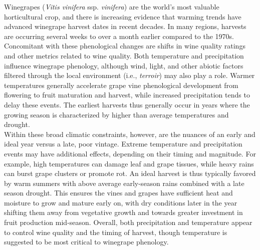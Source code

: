 \documentclass[final]{nature}
\begin{document}
\noindent Winegrapes (\emph{Vitis vinifera} ssp. \emph{vinifera}) are the world's most valuable horticultural crop, and there is increasing evidence that warming trends have advanced winegrape harvest dates in recent decades\cite{Jones:2000br,schultzjones,tomasi2011,odo2012,webb2012}. In many regions, harvests are occurring several weeks to over a month earlier compared to the 1970s\cite{Duchene:2005bd,Seguin2005,webb2011}. Concomitant with these phenological changes are shifts in wine quality ratings\cite{jones2005} and other metrics related to wine quality\cite{Jones:2000br,mori2007}. Both temperature and precipitation influence winegrape phenology, although wind, light, and other abiotic factors filtered through the local environment (i.e., \emph{terroir}) may also play a role\cite{Gladstones2011}. Warmer temperatures generally accelerate grape vine phenological development from flowering to fruit maturation and harvest, while increased precipitation tends to delay these events\cite{jones2013}. The earliest harvests thus generally occur in years where the growing season is characterized by higher than average temperatures and drought\cite{Jones:2000br}.\\
\indent Within these broad climatic constraints, however, are the nuances of an early and ideal year versus a late, poor vintage. Extreme temperature and precipitation events may have additional effects, depending on their timing and magnitude. For example, high temperatures can damage leaf and grape tissues\cite{greer2010,Gladstones2011}, while heavy rains can burst grape clusters or promote rot\cite{jones2013}. An ideal harvest is thus typically favored by warm summers with above average early-season rains combined with a late season drought. This ensures the vines and grapes have sufficient heat and moisture to grow and mature early on, with dry conditions later in the year shifting them away from vegetative growth and towards greater investment in fruit production mid-season\cite{chaves2010,jones2013,baciocco2014}. Overall, both precipitation\cite{vanlee2009} and temperature\cite{baciocco2014} appear to control wine quality and the timing of harvest\cite{odo2012,webb2012}, though temperature is suggested to be most critical to winegrape phenology\cite{coombe1987,jones2005}.\\
\end{document}
